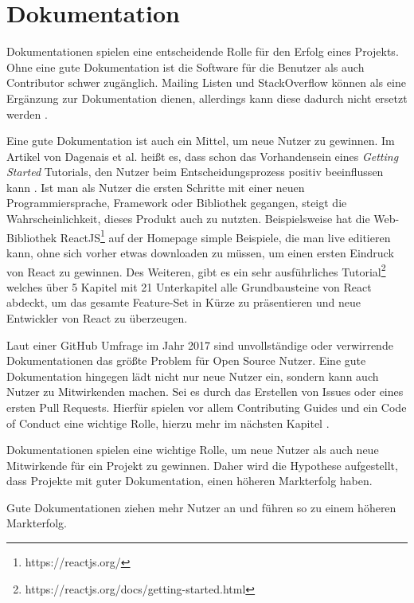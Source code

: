 \section{Dokumentation}



Dokumentationen spielen eine entscheidende Rolle für den Erfolg eines Projekts.
Ohne eine gute Dokumentation ist die Software für die Benutzer als auch Contributor schwer zugänglich. 
Mailing Listen und StackOverflow können als eine Ergänzung zur Dokumentation dienen, allerdings kann
diese dadurch nicht ersetzt werden \cite{bangerthWhatMakesComputational2013}. %

Eine gute Dokumentation ist auch ein Mittel, um neue Nutzer zu gewinnen. Im Artikel von Dagenais et al. heißt es,
dass schon das Vorhandensein eines \textit{Getting Started} Tutorials, den Nutzer beim 
Entscheidungsprozess positiv beeinflussen kann \cite{dagenaisDeveloperDocumentation}. %
Ist man als Nutzer die ersten Schritte mit einer neuen Programmiersprache, Framework oder Bibliothek
gegangen, steigt die Wahrscheinlichkeit, dieses Produkt auch zu nutzten.
Beispielsweise hat die Web-Bibliothek ReactJS\footnote{https://reactjs.org/} auf der Homepage simple 
Beispiele, die man live editieren kann, ohne sich vorher etwas downloaden zu müssen, um einen
ersten Eindruck von React zu gewinnen.
Des Weiteren, gibt es ein sehr ausführliches Tutorial\footnote{https://reactjs.org/docs/getting-started.html}
welches über 5 Kapitel mit 21 Unterkapitel alle Grundbausteine von React abdeckt, um das gesamte 
Feature-Set in Kürze zu präsentieren und neue Entwickler von React zu überzeugen.

Laut einer GitHub Umfrage im Jahr 2017 sind unvollständige oder verwirrende Dokumentationen das größte
Problem für Open Source Nutzer. Eine gute Dokumentation hingegen lädt nicht nur neue Nutzer ein,
sondern kann auch Nutzer zu Mitwirkenden machen.
Sei es durch das Erstellen von Issues oder eines ersten Pull Requests.
Hierfür spielen vor allem Contributing Guides und ein Code of Conduct eine wichtige Rolle, hierzu
mehr im nächsten Kapitel \cite{GitHubOpenSourceSurvey2017}.

Dokumentationen spielen eine wichtige Rolle, um neue Nutzer als auch neue Mitwirkende für ein
Projekt zu gewinnen. 
Daher wird die Hypothese aufgestellt, dass Projekte mit guter Dokumentation, einen höheren
Markterfolg haben.


\begin{hypothesis}
    Gute Dokumentationen ziehen mehr Nutzer an und führen so zu einem höheren Markterfolg.
\end{hypothesis}